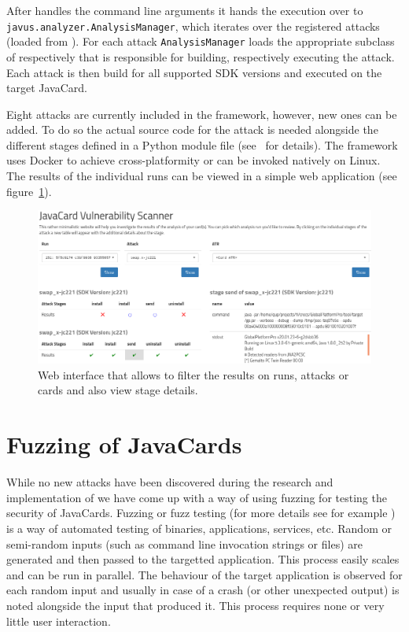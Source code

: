 \documentclass{../llncs/llncs}
\begin{document}
    After \shortappclass handles the command line arguments it hands the execution over to \texttt{javus.analyzer.AnalysisManager}, which iterates over the registered attacks (loaded from ). For each attack \texttt{AnalysisManager} loads the appropriate subclass of \shortbuilderclass respectively \shortexecutorclass that is responsible for building, respectively executing the attack. Each attack is then build for all supported SDK versions and executed on the target JavaCard.

    Eight attacks are currently included in the framework, however, new ones can be added. To do so the actual source code for the attack is needed alongside the different stages defined in a Python module file (see~\cite{Kvapil2020thesis} for details). The framework uses Docker to achieve cross-platformity or can be invoked natively on Linux. The results of the individual runs can be viewed in a simple web application (see figure~\ref{fig:web-interface-pic}).

    \begin{figure}[htb]
        \centering
        \includegraphics[width=\textwidth]{src/imgs/overview-plus-detail.png}
        \caption{Web interface that allows to filter the results on runs, attacks or cards and also view stage details.\label{fig:web-interface-pic}}
    \end{figure}

\section{Fuzzing of JavaCards\label{sec:fuzzing}}
While no new attacks have been discovered during the research and implementation of \projectname we have come up with a way of using fuzzing for testing the security of JavaCards. Fuzzing or fuzz testing (for more details see for example \cite{ossfuzz}) is a way of automated testing of binaries, applications, services, etc. Random or semi-random inputs (such as command line invocation strings or files) are generated and then passed to the targetted application. This process easily scales and can be run in parallel. The behaviour of the target application is observed for each random input and usually in case of a crash (or other unexpected output) is noted alongside the input that produced it. This process requires none or very little user interaction.
\end{document}
